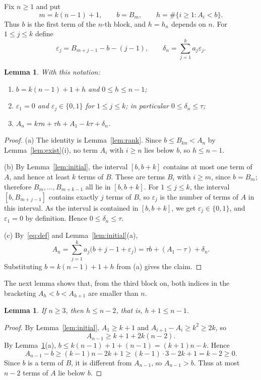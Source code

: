 \documentclass{amsart}
\newtheorem{lemma}[theorem]{Lemma}
\theoremstyle{definition}
\theoremstyle{remark}
\numberwithin{equation}{section}
\numberwithin{table}{section}
\begin{document}
Fix $n\ge1$ and put
\[
m=k(n-1)+1,\qquad b=B_m,\qquad h=\#\{i\ge1:A_i<b\}.
\]
Thus $b$ is the first term of the $n$-th block, and $h=h_n$ depends on $n$. For $1\le j\le k$ define
\[
\varepsilon_j=B_{m+j-1}-b-(j-1),\qquad \delta_n=\sum_{j=1}^{k}a_j\varepsilon_j.
\]

\begin{lemma}\label{lem:block}
With this notation:
\begin{enumerate}
\item[(a)] $b=k(n-1)+1+h$ and $0\le h\le n-1$;
\item[(b)] $\varepsilon_1=0$ and $\varepsilon_j\in\{0,1\}$ for $1\le j\le k$; in particular $0\le\delta_n\le\tau$;
\item[(c)] $A_n=k\tau n+\tau h+A_1-k\tau+\delta_n$.
\end{enumerate}
\end{lemma}

\begin{proof}
(a) The identity is Lemma~\ref{lem:rank}. Since $b\le B_{kn}<A_n$ by Lemma~\ref{lem:exist}(i), no term $A_i$ with $i\ge n$ lies below $b$, so $h\le n-1$.

(b) By Lemma~\ref{lem:initial}, the interval $[b,b+k]$ contains at most one term of $A$, and hence at least $k$ terms of $B$. These are terms $B_i$ with $i\ge m$, since $b=B_m$; therefore $B_m,\dots,B_{m+k-1}$ all lie in $[b,b+k]$. For $1\le j\le k$, the interval $[b,B_{m+j-1}]$ contains exactly $j$ terms of $B$, so $\varepsilon_j$ is the number of terms of $A$ in this interval. As the interval is contained in $[b,b+k]$, we get $\varepsilon_j\in\{0,1\}$, and $\varepsilon_1=0$ by definition. Hence $0\le\delta_n\le\tau$.

(c) By~\eqref{eq:def} and Lemma~\ref{lem:initial}(a),
\[
A_n=\sum_{j=1}^k a_j\bigl(b+j-1+\varepsilon_j\bigr)=\tau b+(A_1-\tau)+\delta_n.
\]
Substituting $b=k(n-1)+1+h$ from (a) gives the claim.
\end{proof}

The next lemma shows that, from the third block on, both indices in the bracketing $A_h<b<A_{h+1}$ are smaller than $n$.

\begin{lemma}\label{lem:earlier}
If $n\ge3$, then $h\le n-2$, that is, $h+1\le n-1$.
\end{lemma}

\begin{proof}
By Lemma~\ref{lem:initial}, $A_1\ge k+1$ and $A_{i+1}-A_i\ge k^2\ge2k$, so
\[
A_{n-1}\ge k+1+2k(n-2).
\]
By Lemma~\ref{lem:block}(a), $b\le k(n-1)+1+(n-1)=(k+1)n-k$. Hence
\[
A_{n-1}-b\ge(k-1)n-2k+1\ge(k-1)\cdot3-2k+1=k-2\ge0.
\]
Since $b$ is a term of $B$, it is different from $A_{n-1}$, so $A_{n-1}>b$. Thus at most $n-2$ terms of $A$ lie below $b$.
\end{proof}
\end{document}
